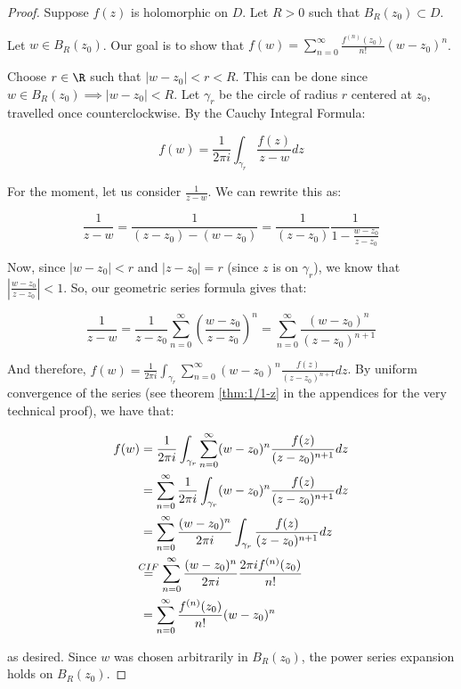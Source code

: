 \begin{proof} Suppose $f(z)$ is holomorphic on $D$. Let $R > 0$ such that $B_R(z_0) \subset D$.

Let $w \in B_R(z_0)$. Our goal is to show that $f(w) = \sum_{n = 0}^\infty \frac{f^{(n)}(z_0)}{n!}(w-z_0)^n$.

Choose $r \in \R$ such that $|w - z_0| < r < R$. This can be done since $w \in B_R(z_0) \implies |w - z_0| < R$. Let $\gamma_r$ be the circle of radius $r$ centered at $z_0$, travelled once counterclockwise. By the Cauchy Integral Formula:

$$f(w) = \frac{1}{2\pi i } \int_{\gamma_r} \frac{f(z)}{z-w}dz$$

For the moment, let us consider $\frac{1}{z-w}$. We can rewrite this as:

$$\frac{1}{z-w} = \frac{1}{(z-z_0) - (w - z_0)} = \frac{1}{(z-z_0)}\frac{1}{1- \frac{w - z_0}{z-z_0}}$$

Now, since $|w - z_0| < r$ and $|z - z_0| = r$ (since $z$ is on $\gamma_r$), we know that $\left|\frac{w-z_0}{z-z_0}\right| < 1$. So, our geometric series formula gives that:

$$\frac{1}{z-w} = \frac{1}{z-z_0} \sum_{n = 0}^\infty \left(\frac{w - z_0}{z-z_0}\right)^n = \sum_{n = 0}^\infty \frac{(w-z_0)^n}{(z-z_0)^{n+1}}$$

And therefore, $f(w) = \frac{1}{2\pi i} \int_{\gamma_r} \sum_{n = 0}^\infty (w-z_0)^n\frac{f(z)}{(z-z_0)^{n+1}}dz$. By uniform convergence of the series (see theorem \ref{thm:1/1-z} in the appendices for the very technical proof), we have that:

\begin{align*}f(w) &= \frac{1}{2\pi i} \int_{\gamma_r} \sum_{n = 0}^\infty (w-z_0)^n\frac{f(z)}{(z-z_0)^{n+1}}dz\\
&= \sum_{n = 0}^\infty \frac{1}{2\pi i}\int_{\gamma_r} (w-z_0)^n\frac{f(z)}{(z-z_0)^{n+1}} dz\\
&=\sum_{n = 0}^\infty \frac{(w-z_0)^n}{2\pi i}\int_{\gamma_r} \frac{f(z)}{(z-z_0)^{n+1}} dz\\
&\hspace{-4pt}\stackrel{CIF}{=} \sum_{n = 0}^\infty \frac{(w-z_0)^n}{2\pi i}\frac{2\pi i f^{(n)}(z_0)}{n!}\\
&= \sum_{n = 0}^\infty \frac{f^{(n)}(z_0)}{n!}(w-z_0)^n
\end{align*}

\noin as desired. Since $w$ was chosen arbitrarily in $B_R(z_0)$, the power series expansion holds on $B_R(z_0)$.

\end{proof}

